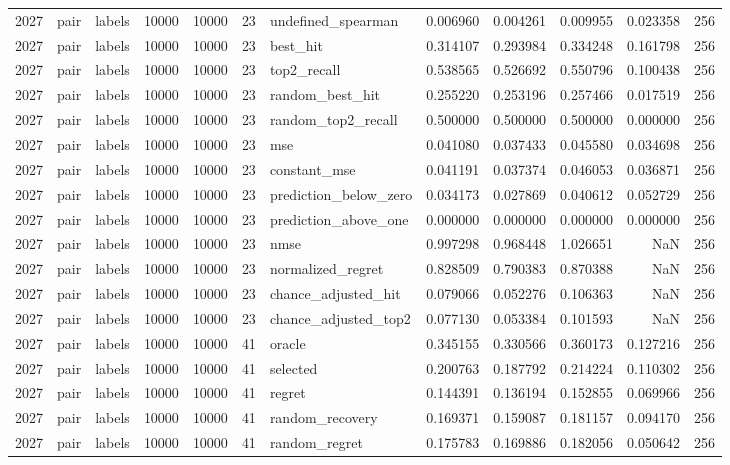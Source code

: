 \begin{tabular}{rllrrrlrrrrr}
2027 & pair & labels & 10000 & 10000 & 23 & undefined_spearman & 0.006960 & 0.004261 & 0.009955 & 0.023358 & 256 \\
2027 & pair & labels & 10000 & 10000 & 23 & best_hit & 0.314107 & 0.293984 & 0.334248 & 0.161798 & 256 \\
2027 & pair & labels & 10000 & 10000 & 23 & top2_recall & 0.538565 & 0.526692 & 0.550796 & 0.100438 & 256 \\
2027 & pair & labels & 10000 & 10000 & 23 & random_best_hit & 0.255220 & 0.253196 & 0.257466 & 0.017519 & 256 \\
2027 & pair & labels & 10000 & 10000 & 23 & random_top2_recall & 0.500000 & 0.500000 & 0.500000 & 0.000000 & 256 \\
2027 & pair & labels & 10000 & 10000 & 23 & mse & 0.041080 & 0.037433 & 0.045580 & 0.034698 & 256 \\
2027 & pair & labels & 10000 & 10000 & 23 & constant_mse & 0.041191 & 0.037374 & 0.046053 & 0.036871 & 256 \\
2027 & pair & labels & 10000 & 10000 & 23 & prediction_below_zero & 0.034173 & 0.027869 & 0.040612 & 0.052729 & 256 \\
2027 & pair & labels & 10000 & 10000 & 23 & prediction_above_one & 0.000000 & 0.000000 & 0.000000 & 0.000000 & 256 \\
2027 & pair & labels & 10000 & 10000 & 23 & nmse & 0.997298 & 0.968448 & 1.026651 & NaN & 256 \\
2027 & pair & labels & 10000 & 10000 & 23 & normalized_regret & 0.828509 & 0.790383 & 0.870388 & NaN & 256 \\
2027 & pair & labels & 10000 & 10000 & 23 & chance_adjusted_hit & 0.079066 & 0.052276 & 0.106363 & NaN & 256 \\
2027 & pair & labels & 10000 & 10000 & 23 & chance_adjusted_top2 & 0.077130 & 0.053384 & 0.101593 & NaN & 256 \\
2027 & pair & labels & 10000 & 10000 & 41 & oracle & 0.345155 & 0.330566 & 0.360173 & 0.127216 & 256 \\
2027 & pair & labels & 10000 & 10000 & 41 & selected & 0.200763 & 0.187792 & 0.214224 & 0.110302 & 256 \\
2027 & pair & labels & 10000 & 10000 & 41 & regret & 0.144391 & 0.136194 & 0.152855 & 0.069966 & 256 \\
2027 & pair & labels & 10000 & 10000 & 41 & random_recovery & 0.169371 & 0.159087 & 0.181157 & 0.094170 & 256 \\
2027 & pair & labels & 10000 & 10000 & 41 & random_regret & 0.175783 & 0.169886 & 0.182056 & 0.050642 & 256 \\

\end{tabular}
